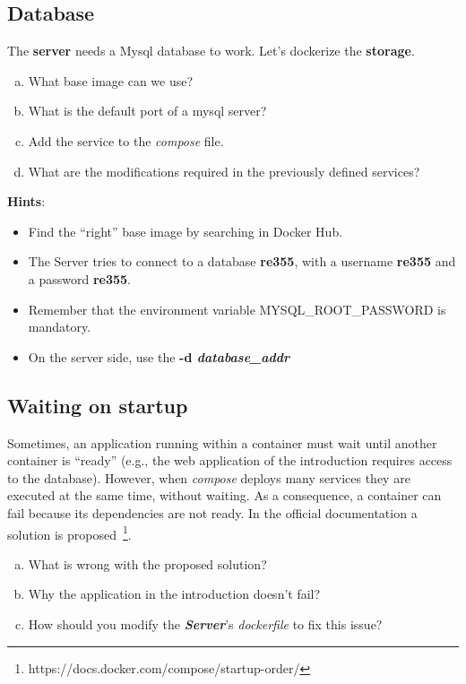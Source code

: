 \documentclass[a4paper,11pt]{exam}
\begin{document}
\subsection{Database}
	\begin{questions}
		\question The \textbf{server} needs a Mysql database to work. Let's dockerize the \textbf{storage}.
	
	\begin{enumerate}[(a)] %
		\item What base image can we use?
		\item What is the default port of a mysql server?
		\item Add the service to the \textit{compose} file.
		\item What are the modifications required in the previously defined services?
	\end{enumerate}
		\textbf{Hints}:
	\begin{itemize}
		\item Find the ``right'' base image by searching in Docker Hub.

		\item The Server tries to connect to a database \textbf{re355}, with a username \textbf{re355} and a password \textbf{re355}.

		\item Remember that the environment variable MYSQL\_ROOT\_PASSWORD is mandatory.

		\item On the server side, use the \textbf{-d \textit{database\_addr}}

	\end{itemize}
	\end{questions}
	
\subsection{Waiting on startup}	
	\begin{questions}

	\question Sometimes, an application running within a container must wait until another container is ``ready'' (e.g., the web application of the introduction requires access to the database). However, when \textit{compose} deploys many services they are executed at the same time, without waiting. As a consequence, a container can fail because its dependencies are not ready. In the official documentation a solution is proposed~\footnote{https://docs.docker.com/compose/startup-order/}.
	
		\begin{enumerate}[(a)] %
			\item What is wrong with the proposed solution?
			\item Why the application in the introduction doesn't fail?
			\item How should you modify the \textit{\textbf{Server}}'s \textit{dockerfile} to fix this issue?
		\end{enumerate}
	\end{questions}
\end{document}
